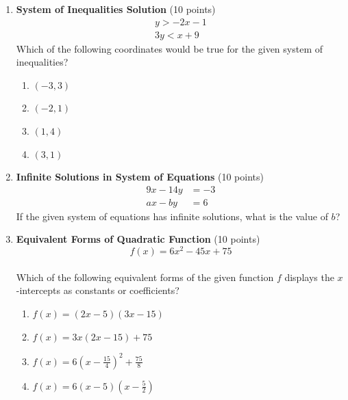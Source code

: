 \begin{enumerate}
  \item \textbf{System of Inequalities Solution} (10 points)\\
  \[
    \begin{gathered}
    y>-2x-1 \\
    3y<x+9
    \end{gathered}
  \]
  Which of the following coordinates would be true for the given system of inequalities?
  \begin{enumerate}[label=\Alph*.]
    \item $(-3,3)$
    \item $(-2,1)$
    \item $(1,4)$
    \item $(3,1)$
  \end{enumerate}
  \begin{subanswer}
  \end{subanswer}

  \item \textbf{Infinite Solutions in System of Equations} (10 points)\\
  \[
    \begin{aligned}
    9x-14y &= -3 \\
    ax-by &= 6
    \end{aligned}
  \]
  If the given system of equations has infinite solutions, what is the value of $b$?
  \begin{subanswer}
  \end{subanswer}

  \newpage

  \item \textbf{Equivalent Forms of Quadratic Function} (10 points)\\
  $$f(x)=6x^2-45x+75$$\\
  Which of the following equivalent forms of the given function $f$ displays the $x$-intercepts as constants or coefficients?
  \begin{enumerate}[label=\Alph*.]
    \item $f(x)=(2x-5)(3x-15)$
    \item $f(x)=3x(2x-15)+75$
    \item $f(x)=6\left(x-\frac{15}{4}\right)^2+\frac{75}{8}$
    \item $f(x)=6(x-5)\left(x-\frac{5}{2}\right)$
  \end{enumerate}
  \begin{subanswer}
  \end{subanswer}


\end{enumerate}
